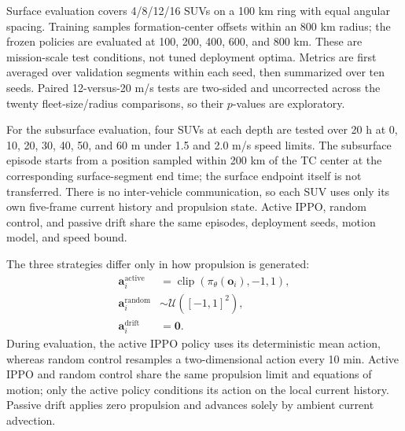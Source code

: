 \documentclass[a4paper,fleqn]{cas-dc}
\begin{document}
Surface evaluation covers 4/8/12/16 SUVs on a 100 km ring with equal angular
spacing. Training samples formation-center offsets within an 800 km radius;
the frozen policies are evaluated at 100, 200, 400, 600, and 800 km. These are
mission-scale test conditions, not tuned deployment optima. Metrics are first
averaged over validation segments within each seed, then summarized over ten
seeds. Paired 12-versus-20 m/s tests are two-sided and uncorrected across the
twenty fleet-size/radius comparisons, so their $p$-values are exploratory.

For the subsurface evaluation, four SUVs at each depth are tested over 20 h at
0, 10, 20, 30, 40, 50, and 60 m under 1.5 and 2.0 m/s speed limits. The
subsurface episode starts from a position sampled within 200 km of the TC
center at the corresponding surface-segment end time; the surface endpoint
itself is not transferred. There is no inter-vehicle communication, so each
SUV uses only its own five-frame current history and propulsion state.
Active IPPO, random control, and passive drift share the same episodes,
deployment seeds, motion model, and speed bound.

The three strategies differ only in how propulsion is generated:
\begin{equation}
\begin{aligned}
\mathbf{a}_i^{\mathrm{active}}
&=
\operatorname{clip}
\left(\pi_\theta(\mathbf{o}_i),-1,1\right),\\
\mathbf{a}_i^{\mathrm{random}}
&\sim
\mathcal U\left([-1,1]^2\right),\\
\mathbf{a}_i^{\mathrm{drift}}
&=
\mathbf{0}.
\end{aligned}
\label{eq:underwater_policy_actions}
\end{equation}
During evaluation, the active IPPO policy uses its deterministic mean action,
whereas random control resamples a two-dimensional action every 10 min.
Active IPPO and random control share the same propulsion limit and equations
of motion; only the active policy conditions its action on the local current
history. Passive drift applies zero propulsion and advances solely by ambient
current advection.
\end{document}
